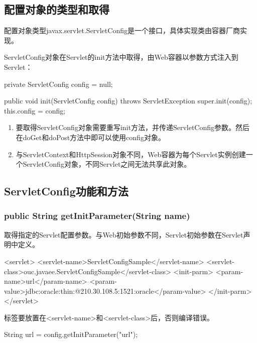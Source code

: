\subsection{配置对象的类型和取得} 

配置对象类型javax.servlet.ServletConfig是一个接口，具体实现类由容器厂商实现。

ServletConfig对象在Servlet的init方法中取得，由Web容器以参数方式注入到Servlet：

\begin{javaCode}
  private ServletConfig config = null;

  public void init(ServletConfig config) throws ServletException {
    super.init(config);
    this.config = config;
  }
\end{javaCode}

\begin{enumerate}\kai
\item 要取得ServletConfig对象需要重写init方法，并传递ServletConfig参数。然后
  在doGet和doPost方法中即可以使用config对象。
\item 与ServletContext和HttpSession对象不同，Web容器为每个Servlet实例创建一
  个ServletConfig对象，不同Servlet之间无法共享此对象。
\end{enumerate}

\subsection{ServletConfig功能和方法} 

\subsubsection{public String getInitParameter(String name)} 

取得指定的Servlet配置参数。与Web初始参数不同，Servlet初始参数在Servlet声明中定义。

\begin{xmlCode}
  <servlet>  
  <servlet-name>ServletConfigSample</servlet-name>
  <servlet-class>ouc.javaee.ServletConfigSample</servlet-class>
  <init-parm>
  <param-name>url</param-name>
  <param-value>jdbc:oracle:thin:@210.30.108.5:1521:oracle</param-value>
  </init-parm>
  </servlet>  
\end{xmlCode}

 {标签要放置在<servlet-name>和<servlet-class>后，否则编译错误。}


\begin{javaCode}
  String url = config.getInitParameter("url");
\end{javaCode}

